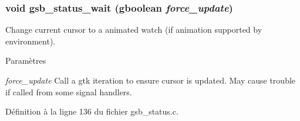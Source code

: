 \subsubsection[{gsb\_\-status\_\-wait}]{\setlength{\rightskip}{0pt plus 5cm}void gsb\_\-status\_\-wait (gboolean {\em force\_\-update})}\label{gsb__status_8h_a16da6eed5923c59ba4584c96af26ff41}
Change current cursor to a animated watch (if animation supported by environment).


\begin{DoxyParams}{Paramètres}
\item[{\em force\_\-update}]Call a gtk iteration to ensure cursor is updated. May cause trouble if called from some signal handlers. \end{DoxyParams}


Définition à la ligne 136 du fichier gsb\_\-status.c.

